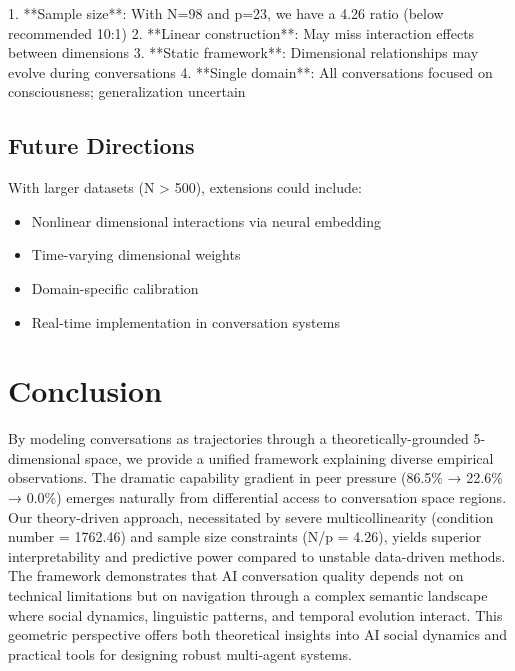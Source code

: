 \documentclass[11pt,letterpaper]{article}
\newcommand{\totalConversations}{98}
\newcommand{\featureCount}{23}
\newcommand{\sampleFeatureRatio}{4.26}
\newcommand{\conditionNumber}{1762.46}
\newcommand{\fullReasoningPeerPressure}{86.5\%}
\newcommand{\lightReasoningPeerPressure}{22.6\%}
\newcommand{\nonReasoningPeerPressure}{0.0\%}
\newcommand{\minSampleSize}{500}
\newcommand{\recommendedRatio}{10}
\newcommand{\dimensionalCoverage}{5}
\begin{document}
1. **Sample size**: With N=\totalConversations{} and p=\featureCount{}, we have a \sampleFeatureRatio{} ratio (below recommended \recommendedRatio{}:1)
2. **Linear construction**: May miss interaction effects between dimensions
3. **Static framework**: Dimensional relationships may evolve during conversations
4. **Single domain**: All conversations focused on consciousness; generalization uncertain

\subsection{Future Directions}

With larger datasets (N > \minSampleSize{}), extensions could include:
\begin{itemize}
    \item Nonlinear dimensional interactions via neural embedding
    \item Time-varying dimensional weights
    \item Domain-specific calibration
    \item Real-time implementation in conversation systems
\end{itemize}

\section{Conclusion}

By modeling conversations as trajectories through a theoretically-grounded \dimensionalCoverage{}-dimensional space, we provide a unified framework explaining diverse empirical observations. The dramatic capability gradient in peer pressure (\fullReasoningPeerPressure{} → \lightReasoningPeerPressure{} → \nonReasoningPeerPressure{}) emerges naturally from differential access to conversation space regions. Our theory-driven approach, necessitated by severe multicollinearity (condition number = \conditionNumber{}) and sample size constraints (N/p = \sampleFeatureRatio{}), yields superior interpretability and predictive power compared to unstable data-driven methods. The framework demonstrates that AI conversation quality depends not on technical limitations but on navigation through a complex semantic landscape where social dynamics, linguistic patterns, and temporal evolution interact. This geometric perspective offers both theoretical insights into AI social dynamics and practical tools for designing robust multi-agent systems.



\end{document}
